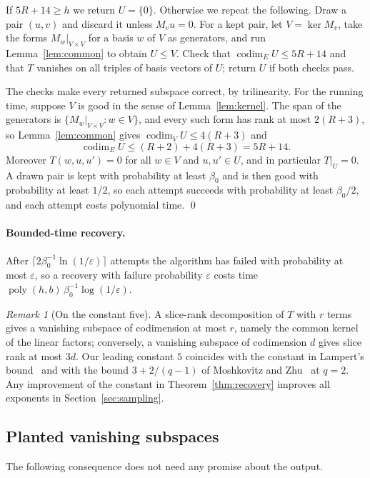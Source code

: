 \documentclass[a4paper,onecolumn,11pt,unpublished]{quantumarticle}
\theoremstyle{plain}
\theoremstyle{remark}
\newtheorem{remark}[theorem]{Remark}
\DeclareMathOperator{\codim}{codim}
\DeclareMathOperator{\poly}{poly}
\begin{document}
If $5R+14\ge h$ we return $U=\{0\}$. Otherwise we repeat the following. Draw a pair $(u,v)$ and discard it unless $M_vu=0$. For a kept pair, let $V=\ker M_v$, take the forms $M_w|_{V\times V}$ for a basis $w$ of $V$ as generators, and run Lemma~\ref{lem:common} to obtain $U\le V$. Check that $\codim_EU\le5R+14$ and that $T$ vanishes on all triples of basis vectors of $U$; return $U$ if both checks pass.

The checks make every returned subspace correct, by trilinearity. For the running time, suppose $V$ is good in the sense of Lemma~\ref{lem:kernel}. The span of the generators is $\{M_w|_{V\times V}:w\in V\}$, and every such form has rank at most $2(R+3)$, so Lemma~\ref{lem:common} gives $\codim_VU\le4(R+3)$ and
\[
\codim_EU\le(R+2)+4(R+3)=5R+14 .
\]
Moreover $T(w,u,u')=0$ for all $w\in V$ and $u,u'\in U$, and in particular $T|_U=0$. A drawn pair is kept with probability at least $\beta_0$ and is then good with probability at least $1/2$, so each attempt succeeds with probability at least $\beta_0/2$, and each attempt costs polynomial time. \qed

\paragraph{Bounded-time recovery.}
After $\lceil2\beta_0^{-1}\ln(1/\varepsilon)\rceil$ attempts the algorithm has failed with probability at most $\varepsilon$, so a recovery with failure probability $\varepsilon$ costs time $\poly(h,b)\,\beta_0^{-1}\log(1/\varepsilon)$.

\begin{remark}[On the constant five]\label{rem:constant}
A slice-rank decomposition of $T$ with $r$ terms gives a vanishing subspace of codimension at most $r$, namely the common kernel of the linear factors; conversely, a vanishing subspace of codimension $d$ gives slice rank at most $3d$. Our leading constant $5$ coincides with the constant in Lampert's bound~\cite{Lam25} and with the bound $3+2/(q-1)$ of Moshkovitz and Zhu~\cite{MZ26} at $q=2$. Any improvement of the constant in Theorem~\ref{thm:recovery} improves all exponents in Section~\ref{sec:sampling}.
\end{remark}

\subsection{Planted vanishing subspaces}

The following consequence does not need any promise about the output.
\end{document}
